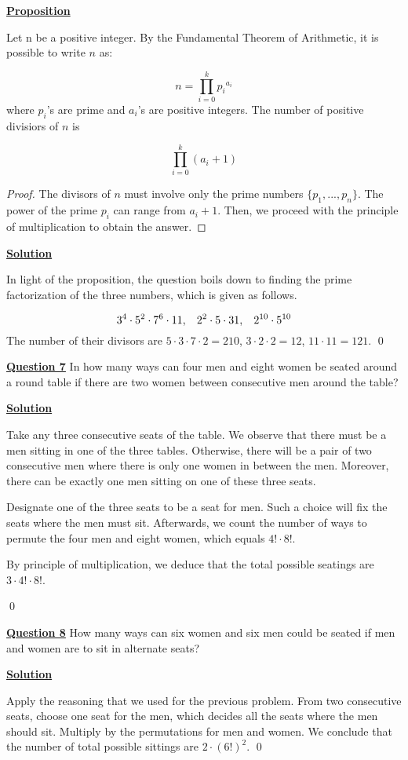 \documentclass{article}
\newcommand{\new}[1]{
    \vspace{2mm}
    \noindent
    \textbf{
    \underline{#1}}
}
\newcommand{\m}{
    \cdot
}
\begin{document}
\new{Proposition} 
Let n be a positive integer. By the Fundamental Theorem of Arithmetic, 
it is possible to write $n$ as:

\[
    n = \prod_{i = 0}^{k} {p_i}^{a_i}
\]
where $p_i$'s are prime and $a_i$'s are positive integers. The number 
of positive divisiors of $n$ is

\[
    \prod_{i = 0}^{k} (a_i + 1)
\]

\begin{proof}
    The divisors of $n$ must involve only the prime numbers 
    $\{p_1, ..., p_n\}$. The power of the prime $p_i$ can range 
    from $a_i + 1$. Then, we proceed with the principle of multiplication 
    to obtain the answer.
\end{proof}

\new{Solution} 
In light of the proposition, the question boils down to finding 
the prime factorization of the three numbers, which is given as follows. 

\[
    3^4\cdot5^2\cdot7^6\cdot11,\hspace{3mm} 2^2\cdot5\cdot31, \hspace{3mm} 2^{10}\cdot5^{10}
\]
The number of their divisors are $5\m3\m7\m2 = 210$,  $3\m2\m2 = 12$,  $11\m11 = 121$. \qed

\new{Question 7} In how many ways can four men and eight women be 
seated around a round table if there are two women between consecutive 
men around the table?

\new{Solution} 
Take any three consecutive seats of the table. We observe that there 
must be a men sitting in one of the three tables. Otherwise, there 
will be a pair of two consecutive men where there is only one women 
in between the men. Moreover, there can be exactly one men sitting 
on one of these three seats. 

Designate one of the three seats to be a seat for men. Such a choice 
will fix the seats where the men must sit. Afterwards, we count 
the number of ways to permute the four men and eight women, which 
equals $4!\m8!$. 

By principle of multiplication, we deduce that the total possible 
seatings are $\boxed{3\m4!\m8!}$.

\hfill \qed

\new{Question 8} How many ways can six women and six men could 
be seated if men and women are to sit in alternate seats?

\new{Solution} 
Apply the reasoning that we used for the previous problem. 
From two consecutive seats, choose one seat for the men, which 
decides all the seats where the men should sit. Multiply by the 
permutations for men and women. We conclude that the number of 
total possible sittings are $\boxed{2\m (6!)^2}$. \hfill \qed

\normalsize
\end{document}
